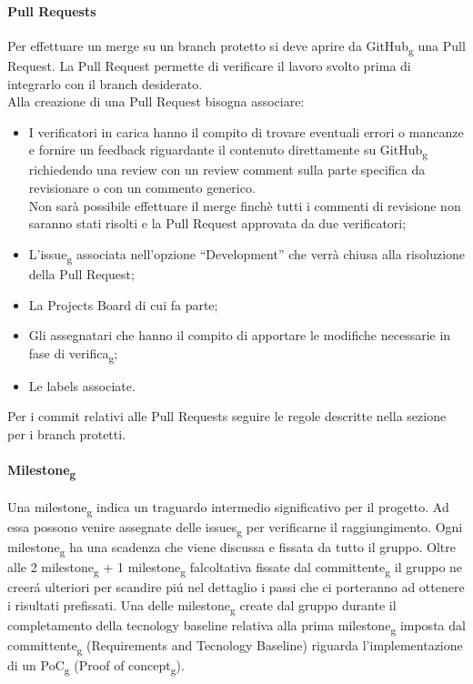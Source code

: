 \paragraph{Pull Requests}
\label{Pull_Requests}
Per effettuare un merge su un branch protetto si deve aprire da GitHub\textsubscript{g} una Pull Request.
La Pull Request permette di verificare il lavoro svolto prima di integrarlo con il branch desiderato.\\
Alla creazione di una Pull Request bisogna associare:
\begin{itemize}
\item I verificatori in carica hanno il compito di trovare eventuali errori o mancanze e fornire un feedback riguardante il contenuto direttamente su GitHub\textsubscript{g} richiedendo
una review con un review comment sulla parte specifica da revisionare o con un commento generico.\\
Non sarà possibile effettuare il merge finchè tutti i commenti di revisione non saranno stati risolti e la Pull Request approvata da due verificatori;
\item L’issue\textsubscript{g} associata nell’opzione “Development” che verrà chiusa alla risoluzione della Pull Request;
\item La Projects Board di cui fa parte;
\item Gli assegnatari che hanno il compito di apportare le modifiche necessarie in fase di verifica\textsubscript{g};
\item Le labels associate.
\end{itemize}
Per i commit relativi alle Pull Requests seguire le regole descritte nella sezione  per i branch protetti.

\paragraph{Milestone\textsubscript{g}}
Una milestone\textsubscript{g} indica un traguardo intermedio significativo per il progetto.
Ad essa possono venire assegnate delle issues\textsubscript{g} per verificarne il raggiungimento.
Ogni milestone\textsubscript{g} ha una scadenza che viene discussa e fissata da tutto il gruppo.
Oltre alle 2 milestone\textsubscript{g} + 1 milestone\textsubscript{g} falcoltativa fissate dal committente\textsubscript{g} il gruppo ne creerá ulteriori per scandire piú nel dettaglio i passi che ci porteranno 
ad ottenere i risultati prefissati.
Una delle milestone\textsubscript{g} create dal gruppo durante il completamento della tecnology baseline relativa alla prima milestone\textsubscript{g} imposta dal committente\textsubscript{g} (Requirements and Tecnology Baseline)
riguarda l'implementazione di un PoC\textsubscript{g} (Proof of concept\textsubscript{g}).

